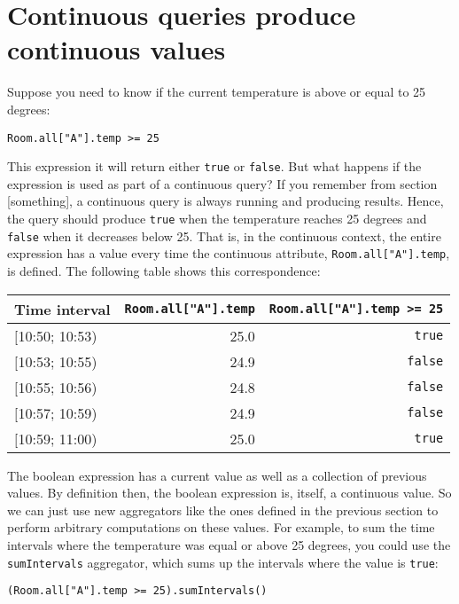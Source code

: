 \documentclass{report}
\begin{document}
\section{Continuous queries produce continuous values}

Suppose you need to know if the current temperature is above or equal
to 25 degrees:

\begin{verbatim}
Room.all["A"].temp >= 25
\end{verbatim}

This expression it will return either \verb=true= or \verb=false=. But
what happens if the expression is used as part of a continuous query?
If you remember from section [something], a continuous query is always
running and producing results. Hence, the query should produce
\verb=true= when the temperature reaches 25 degrees and \verb=false=
when it decreases below 25. That is, in the continuous context, the
entire expression has a value every time the continuous attribute,
\verb=Room.all["A"].temp=, is defined. The following table shows this
correspondence:

\begin{tabular}{ |l|r|r| }
  \hline
  Time interval & \verb=Room.all["A"].temp= & \verb!Room.all["A"].temp >= 25! \\
  \hline
  $[$10:50; 10:53) & 25.0 & \verb=true=  \\
  $[$10:53; 10:55) & 24.9 & \verb=false= \\
  $[$10:55; 10:56) & 24.8 & \verb=false= \\
  $[$10:57; 10:59) & 24.9 & \verb=false= \\
  $[$10:59; 11:00) & 25.0 & \verb=true=  \\
  \hline
\end{tabular}

The boolean expression has a current value as well as a collection of
previous values. By definition then, the boolean expression is,
itself, a continuous value. So we can just use new aggregators like
the ones defined in the previous section to perform arbitrary
computations on these values. For example, to sum the time intervals
where the temperature was equal or above 25 degrees, you could use the
\verb=sumIntervals= aggregator, which sums up the intervals where the
value is \verb=true=:

\begin{verbatim}
(Room.all["A"].temp >= 25).sumIntervals()
\end{verbatim}
\end{document}
